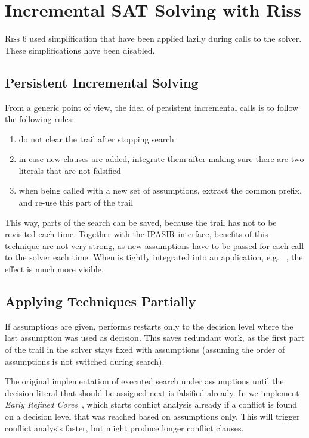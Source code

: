 \documentclass[conference]{IEEEtran}
\begin{document}
\section{Incremental SAT Solving with Riss}

\textsc{Riss 6} used simplification that have been applied lazily during calls to the solver.
These simplifications have been disabled.

\subsection{Persistent Incremental Solving}

From a generic point of view, the idea of persistent incremental calls is to follow the following rules:
% 
\begin{enumerate}
 \item do not clear the trail after stopping search
 \item in case new clauses are added, integrate them after making sure there are two literals that are not falsified
 \item when being called with a new set of assumptions, extract the common prefix, and re-use this part of the trail
\end{enumerate}
% 
This way, parts of the search can be saved, because the trail has not to be revisited each time.
Together with the IPASIR interface, benefits of this technique are not very strong, as new assumptions have to be passed for each call to the solver each time.
When \riss is tightly integrated into an application, e.g. \SATPin~\cite{MaPR16}, the effect is much more visible.

\subsection{Applying Techniques Partially}

If assumptions are given, \riss performs restarts only to the decision level where the last assumption was used as decision.
This saves redundant work, as the first part of the trail in the solver stays fixed with assumptions (assuming the order of assumptions is not switched during search).

The original implementation of \minisat executed search under assumptions until the decision literal that should be assigned next is falsified already.
In \riss we implement \emph{Early Refined Cores}~\cite{CoreRefinementManthey2015}, which starts conflict analysis already if a conflict is found on a decision level that was reached based on assumptions only.
This will trigger conflict analysis faster, but might produce longer conflict clauses.
\end{document}

